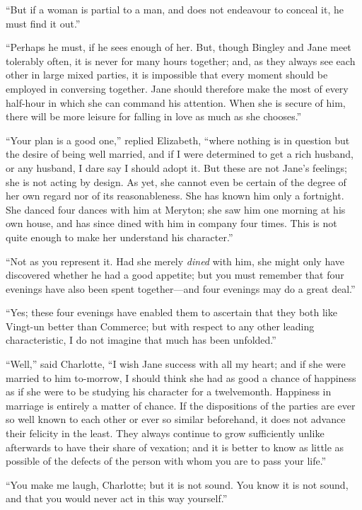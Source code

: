 \documentclass[12pt,english,oneside]{book}
\begin{document}
{}``But if a woman is partial to a man, and does not endeavour to
conceal it, he must find it out.''

{}``Perhaps he must, if he sees enough of her. But, though Bingley
and Jane meet tolerably often, it is never for many hours together;
and, as they always see each other in large mixed parties, it is impossible
that every moment should be employed in conversing together. Jane
should therefore make the most of every half-hour in which she can
command his attention. When she is secure of him, there will be more
leisure for falling in love as much as she chooses.''

{}``Your plan is a good one,'' replied Elizabeth, {}``where nothing
is in question but the desire of being well married, and if I were
determined to get a rich husband, or any husband, I dare say I should
adopt it. But these are not Jane's feelings; she is not acting by
design. As yet, she cannot even be certain of the degree of her own
regard nor of its reasonableness. She has known him only a fortnight.
She danced four dances with him at Meryton; she saw him one morning
at his own house, and has since dined with him in company four times.
This is not quite enough to make her understand his character.''

{}``Not as you represent it. Had she merely \textit{dined} with him,
she might only have discovered whether he had a good appetite; but
you must remember that four evenings have also been spent together\mbox{---}and
four evenings may do a great deal.''

{}``Yes; these four evenings have enabled them to ascertain that
they both like Vingt-un better than Commerce; but with respect to
any other leading characteristic, I do not imagine that much has been
unfolded.''

{}``Well,'' said Charlotte, {}``I wish Jane success with all my
heart; and if she were married to him to-morrow, I should think she
had as good a chance of happiness as if she were to be studying his
character for a twelvemonth. Happiness in marriage is entirely a matter
of chance. If the dispositions of the parties are ever so well known
to each other or ever so similar beforehand, it does not advance their
felicity in the least. They always continue to grow sufficiently unlike
afterwards to have their share of vexation; and it is better to know
as little as possible of the defects of the person with whom you are
to pass your life.''

{}``You make me laugh, Charlotte; but it is not sound. You know it
is not sound, and that you would never act in this way yourself.''
\end{document}
